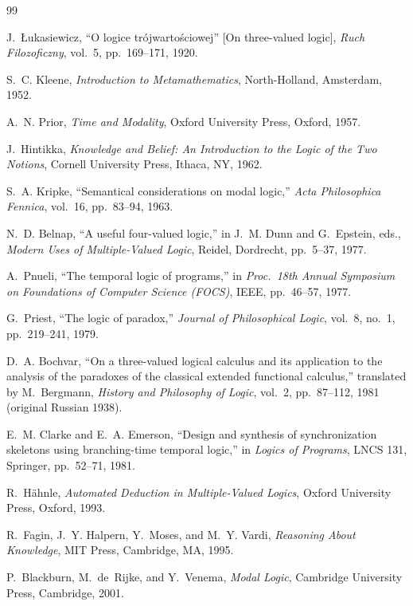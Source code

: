 \documentclass[11pt,a4paper]{article}
\theoremstyle{definition}
\theoremstyle{plain}
\theoremstyle{remark}
\begin{document}
\begin{thebibliography}{99}

J.~{\L}ukasiewicz, ``O logice tr\'ojwarto\'sciowej'' [On three-valued
logic], \emph{Ruch Filozoficzny}, vol.~5, pp.~169--171, 1920.

S.~C. Kleene, \emph{Introduction to Metamathematics}, North-Holland,
Amsterdam, 1952.

A.~N. Prior, \emph{Time and Modality}, Oxford University Press, Oxford,
1957.

J.~Hintikka, \emph{Knowledge and Belief: An Introduction to the Logic of
the Two Notions}, Cornell University Press, Ithaca, NY, 1962.

S.~A. Kripke, ``Semantical considerations on modal logic,''
\emph{Acta Philosophica Fennica}, vol.~16, pp.~83--94, 1963.

N.~D. Belnap, ``A useful four-valued logic,'' in J.~M. Dunn and
G.~Epstein, eds., \emph{Modern Uses of Multiple-Valued Logic}, Reidel,
Dordrecht, pp.~5--37, 1977.

A.~Pnueli, ``The temporal logic of programs,'' in \emph{Proc.\ 18th
Annual Symposium on Foundations of Computer Science (FOCS)}, IEEE,
pp.~46--57, 1977.

G.~Priest, ``The logic of paradox,'' \emph{Journal of Philosophical
Logic}, vol.~8, no.~1, pp.~219--241, 1979.

D.~A. Bochvar, ``On a three-valued logical calculus and its application
to the analysis of the paradoxes of the classical extended functional
calculus,'' translated by M.~Bergmann, \emph{History and Philosophy of
Logic}, vol.~2, pp.~87--112, 1981 (original Russian 1938).

E.~M. Clarke and E.~A. Emerson, ``Design and synthesis of synchronization
skeletons using branching-time temporal logic,'' in \emph{Logics of
Programs}, LNCS 131, Springer, pp.~52--71, 1981.

R.~H{\"a}hnle, \emph{Automated Deduction in Multiple-Valued Logics},
Oxford University Press, Oxford, 1993.

R.~Fagin, J.~Y. Halpern, Y.~Moses, and M.~Y. Vardi, \emph{Reasoning About
Knowledge}, MIT Press, Cambridge, MA, 1995.

P.~Blackburn, M.~de~Rijke, and Y.~Venema, \emph{Modal Logic}, Cambridge
University Press, Cambridge, 2001.


\end{thebibliography}
\end{document}
